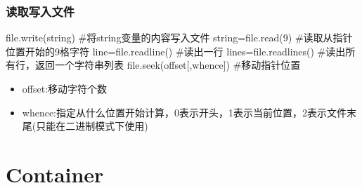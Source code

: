 \documentclass{article}
\begin{document}
      \subsubsection{读取写入文件}
        \begin{codeblock}[language=python, caption={read and write files}]
          file.write(string) #将string变量的内容写入文件
          string=file.read(9) #读取从指针位置开始的9格字符
          line=file.readline() #读出一行
          lines=file.readlines() #读出所有行，返回一个字符串列表
          file.seek(offset[,whence]) #移动指针位置
        \end{codeblock}

        \begin{itemize}
          \item offset:移动字符个数
          \item whence:指定从什么位置开始计算，0表示开头，1表示当前位置，2表示文件末尾(只能在二进制模式下使用)
        \end{itemize}

        
  \section{Container}
\end{document}
